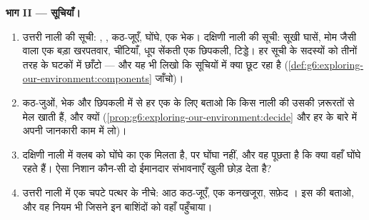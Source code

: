 \begin{problem}
\medskip\noindent\textbf{भाग II --- सूचियाँ।}
\begin{enumerate}[resume]
  \item उत्तरी नाली की सूची: , , कठ-जूएँ, घोंघे, एक भेक। दक्षिणी नाली की
        सूची: सूखी घासें, मोम जैसी  वाला एक बड़ा खरपतवार,
        चींटियाँ, धूप सेंकती एक छिपकली, टिड्डे। हर सूची के सदस्यों को
        तीनों तरह के घटकों में छाँटो --- और यह भी लिखो कि सूचियों में
        क्या छूट रहा है
        (\cref{def:g6:exploring-our-environment:components} जाँचो)।
  \item कठ-जुओं, भेक और छिपकली में से हर एक के लिए बताओ कि किस नाली की
         उसकी ज़रूरतों से मेल खाती हैं, और क्यों
        (\cref{prop:g6:exploring-our-environment:decide} और हर  के
        बारे में अपनी जानकारी काम में लो)।
  \item दक्षिणी नाली में क्लब को घोंघे का एक  मिलता है, पर घोंघा नहीं, और
        वह पूछता है कि क्या वहाँ घोंघे रहते हैं। ऐसा निशान कौन-सी दो
        ईमानदार संभावनाएँ खुली छोड़ देता है?
  \item उत्तरी नाली में एक चपटे पत्थर के नीचे: आठ कठ-जूएँ, एक कनखजूरा,
        सफ़ेद । इस  की  बताओ, और वह नियम
        भी जिसने इन बाशिंदों को वहाँ पहुँचाया।
\end{enumerate}


\end{problem}
